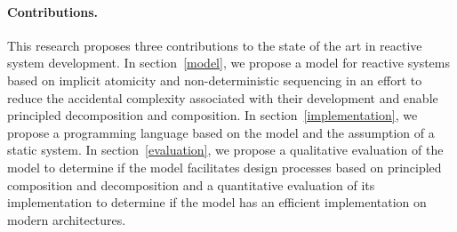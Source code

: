 \paragraph{Contributions.}
This research proposes three contributions to the state of the art in reactive system development.
In section~\ref{model}, we propose a model for reactive systems based on implicit atomicity and non-deterministic sequencing in an effort to reduce the accidental complexity associated with their development and enable principled decomposition and composition.
In section~\ref{implementation}, we propose a programming language based on the model and the assumption of a static system.
In section~\ref{evaluation}, we propose a qualitative evaluation of the model to determine if the model facilitates design processes based on principled composition and decomposition and a quantitative evaluation of its implementation to determine if the model has an efficient implementation on modern architectures.

